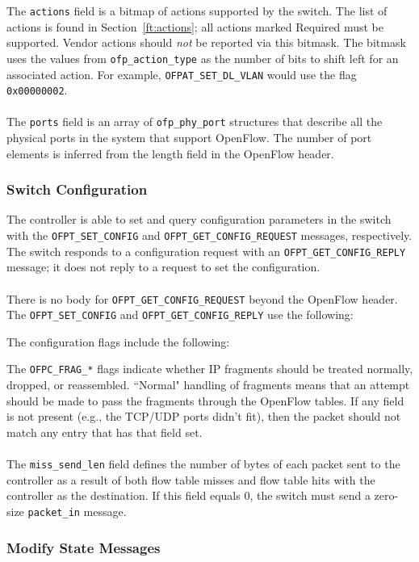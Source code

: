 
The \verb|actions| field is a bitmap of actions supported by the switch.  The list of actions is found in Section~\ref{ft:actions}; all actions marked Required must be supported. Vendor actions should \emph{not} be reported via this bitmask. The bitmask uses the values from \verb|ofp_action_type| as the number of bits to shift left for an associated action. For example, \verb|OFPAT_SET_DL_VLAN| would use the flag \verb|0x00000002|.
\\\\
The \verb|ports| field is an array of \verb|ofp_phy_port| structures that describe all the physical ports in the system that support OpenFlow.  The number of port elements is inferred from the length field in the OpenFlow header. 

\subsubsection{Switch Configuration}
The controller is able to set and query configuration parameters in the switch with the \verb|OFPT_SET_CONFIG| and \verb|OFPT_GET_CONFIG_REQUEST| messages, respectively.  The switch responds to a configuration request with an \verb|OFPT_GET_CONFIG_REPLY| message; it does not reply to a request to set the configuration.  
\\\\
There is no body for \verb|OFPT_GET_CONFIG_REQUEST| beyond the OpenFlow header.  The \verb|OFPT_SET_CONFIG| and \verb|OFPT_GET_CONFIG_REPLY| use the following:


The configuration flags include the following:


The \verb|OFPC_FRAG_*| flags indicate whether IP fragments should be treated normally, dropped, or reassembled.  ``Normal" handling of fragments means that an attempt should be made to pass the fragments through the OpenFlow tables. If any field is not present (e.g., the TCP/UDP ports didn't fit), then the packet should not match any entry that has that field set.
\\\\
The \verb|miss_send_len| field defines the number of bytes of each packet sent to the controller as a result of both flow table misses and flow table hits with the controller as the destination.  If this field equals 0, the switch must send a zero-size \verb|packet_in| message.

\subsubsection{Modify State Messages}
